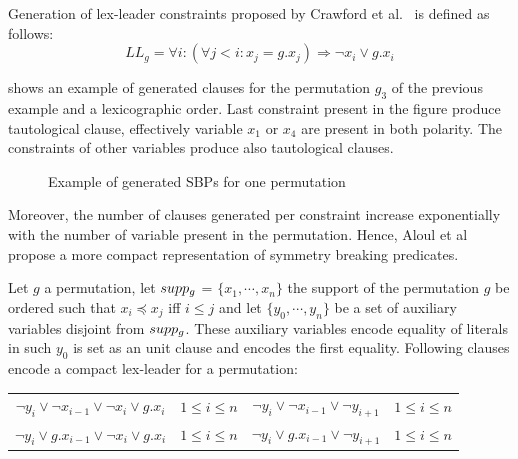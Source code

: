 
%
%
%

Generation of lex-leader constraints proposed by Crawford et al.~\cite{crawford1996symmetry} is defined as follows:
$$ LL_g = \forall i : (\forall j < i : x_j = g.x_j) \Rightarrow  \neg x_i \lor g.x_i$$
 
  shows an example of generated clauses for the  permutation $g_3$ of the previous 
 example and a lexicographic order. Last constraint present in the figure produce tautological clause,
 effectively variable $x_1$ or $x_4$ are present in both polarity. The constraints of other variables produce 
 also tautological clauses. 
 
 
 \begin{figure}[!htbp]
  
  \caption{Example of generated SBPs for one permutation}
  \label{fig:esbp_gen}
 \end{figure}
 
 
 Moreover, the number of clauses generated per constraint increase exponentially with the number of variable present in the permutation.
  Hence, Aloul et al~\cite{aloul06} propose a more compact representation of  symmetry breaking predicates.
 
 Let $g$ a permutation, let $supp_g$ = $\{x_1, \cdots, x_n\}$ the support of the permutation $g$ be ordered 
 such that $x_i \preceq x_j$ iff $i \leq j$  and let $\{y_0,\cdots, y_{n} \}$ be a set of auxiliary variables
 disjoint from $supp_g$. These auxiliary variables encode equality of literals in such $y_0$ is set as an unit clause
 and encodes the first equality.
 Following clauses encode a compact lex-leader for a permutation:
 
\begin{center}
\begin{tabular}{cc|cc}
 $\neg y_i \lor \neg x_{i-1} \lor \neg x_i \lor g.x_i$ & $1 \leq i \leq n$ & $ \neg y_i \lor \neg x_{i-1} \lor \neg y_{i+1}$ & $1 \leq i \leq n$ \\
 $\neg y_i \lor  g.x_{i-1} \lor \neg x_i \lor g.x_i$ & $1 \leq i \leq n$ & $ \neg y_i \lor g.x_{i-1} \lor \neg y_{i+1}$ & $1 \leq i \leq n$ \\
 
\end{tabular}
\end{center}

